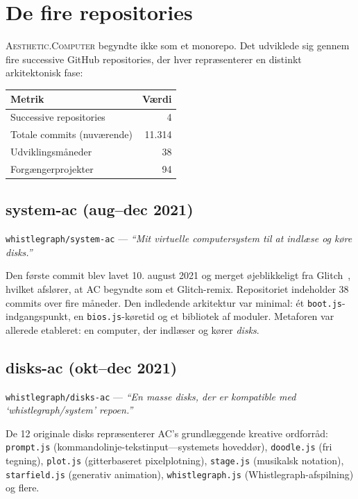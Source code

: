 \documentclass[10pt,letterpaper,twocolumn]{article}
\newcommand{\ac}{\textsc{Aesthetic.Computer}}
\begin{document}
\section{De fire repositories}

\ac{} begyndte ikke som et monorepo. Det udviklede sig gennem fire successive GitHub repositories, der hver repræsenterer en distinkt arkitektonisk fase:

\begin{table}[h]
\small\centering
\begin{tabular}{lr}
\toprule
\textbf{Metrik} & \textbf{Værdi} \\
\midrule
Successive repositories & 4 \\
Totale commits (nuværende) & 11.314 \\
Udviklingsmåneder & 38 \\
Forgængerprojekter & 94 \\
\bottomrule
\end{tabular}
\end{table}

\subsection{system-ac (aug--dec 2021)}

\texttt{whistlegraph/system-ac} --- \emph{``Mit virtuelle computersystem til at indlæse og køre disks.''}

Den første commit blev lavet 10. august 2021 og merget øjeblikkeligt fra Glitch~\citep{glitch2017}, hvilket afslører, at AC begyndte som et Glitch-remix. Repositoriet indeholder 38 commits over fire måneder. Den indledende arkitektur var minimal: ét \texttt{boot.js}-indgangspunkt, en \texttt{bios.js}-køretid og et bibliotek af moduler. Metaforen var allerede etableret: en computer, der indlæser og kører \emph{disks}.

\subsection{disks-ac (okt--dec 2021)}

\texttt{whistlegraph/disks-ac} --- \emph{``En masse disks, der er kompatible med `whistlegraph/system' repoen.''}

De 12 originale disks repræsenterer AC's grundlæggende kreative ordforråd: \texttt{prompt.js} (kommandolinje-tekstinput---systemets hoveddør), \texttt{doodle.js} (fri tegning), \texttt{plot.js} (gitterbaseret pixelplotning), \texttt{stage.js} (musikalsk notation), \texttt{starfield.js} (generativ animation), \texttt{whistlegraph.js} (Whistlegraph-afspilning) og flere.
\end{document}
